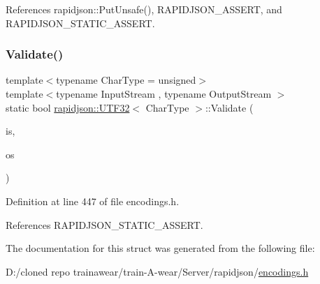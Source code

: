 References rapidjson\+::\+Put\+Unsafe(), R\+A\+P\+I\+D\+J\+S\+O\+N\+\_\+\+A\+S\+S\+E\+RT, and R\+A\+P\+I\+D\+J\+S\+O\+N\+\_\+\+S\+T\+A\+T\+I\+C\+\_\+\+A\+S\+S\+E\+RT.

\mbox{\label{structrapidjson_1_1_u_t_f32_a51a4dccb78915bba67217ace12d294db}} 
\subsubsection{\texorpdfstring{Validate()}{Validate()}}
{\footnotesize\ttfamily template$<$typename Char\+Type  = unsigned$>$ \\
template$<$typename Input\+Stream , typename Output\+Stream $>$ \\
static bool \mbox{\hyperlink{structrapidjson_1_1_u_t_f32}{rapidjson\+::\+U\+T\+F32}}$<$ Char\+Type $>$\+::Validate (\begin{DoxyParamCaption}\item[{Input\+Stream \&}]{is,  }\item[{Output\+Stream \&}]{os }\end{DoxyParamCaption})\hspace{0.3cm}{\ttfamily [static]}}



Definition at line 447 of file encodings.\+h.


\begin{DoxyCode}{0}

\end{DoxyCode}


References R\+A\+P\+I\+D\+J\+S\+O\+N\+\_\+\+S\+T\+A\+T\+I\+C\+\_\+\+A\+S\+S\+E\+RT.



The documentation for this struct was generated from the following file\+:\begin{DoxyCompactItemize}
\item 
D\+:/cloned repo trainawear/train-\/\+A-\/wear/\+Server/rapidjson/\mbox{\hyperlink{encodings_8h}{encodings.\+h}}\end{DoxyCompactItemize}
